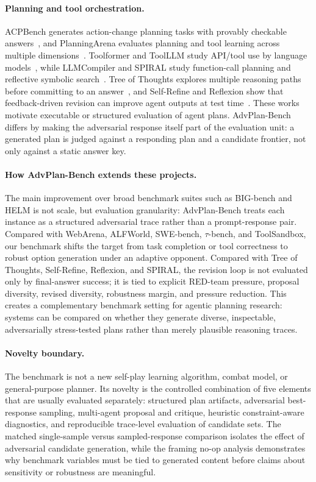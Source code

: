 \documentclass[letterpaper]{article} %
\begin{document}
\paragraph{Planning and tool orchestration.}
ACPBench generates action-change planning tasks with provably checkable answers~\citep{kokel2025acpbench}, and PlanningArena evaluates planning and tool learning across multiple dimensions~\citep{zheng2025planningarena}. Toolformer and ToolLLM study API/tool use by language models~\citep{schick2023toolformer,qin2024toolllm}, while LLMCompiler and SPIRAL study function-call planning and reflective symbolic search~\citep{kim2024llmcompiler,zhang2026spiral}. Tree of Thoughts explores multiple reasoning paths before committing to an answer~\citep{yao2023tree}, and Self-Refine and Reflexion show that feedback-driven revision can improve agent outputs at test time~\citep{madaan2023selfrefine,shinn2023reflexion}. These works motivate executable or structured evaluation of agent plans. AdvPlan-Bench differs by making the adversarial response itself part of the evaluation unit: a generated plan is judged against a responding plan and a candidate frontier, not only against a static answer key.

\paragraph{How AdvPlan-Bench extends these projects.}
The main improvement over broad benchmark suites such as BIG-bench and HELM is not scale, but evaluation granularity: AdvPlan-Bench treats each instance as a structured adversarial trace rather than a prompt-response pair. Compared with WebArena, ALFWorld, SWE-bench, $\tau$-bench, and ToolSandbox, our benchmark shifts the target from task completion or tool correctness to robust option generation under an adaptive opponent. Compared with Tree of Thoughts, Self-Refine, Reflexion, and SPIRAL, the revision loop is not evaluated only by final-answer success; it is tied to explicit RED-team pressure, proposal diversity, revised diversity, robustness margin, and pressure reduction. This creates a complementary benchmark setting for agentic planning research: systems can be compared on whether they generate diverse, inspectable, adversarially stress-tested plans rather than merely plausible reasoning traces.

\paragraph{Novelty boundary.}
The benchmark is not a new self-play learning algorithm, combat model, or general-purpose planner. Its novelty is the controlled combination of five elements that are usually evaluated separately: structured plan artifacts, adversarial best-response sampling, multi-agent proposal and critique, heuristic constraint-aware diagnostics, and reproducible trace-level evaluation of candidate sets. The matched single-sample versus sampled-response comparison isolates the effect of adversarial candidate generation, while the framing no-op analysis demonstrates why benchmark variables must be tied to generated content before claims about sensitivity or robustness are meaningful.
\end{document}
